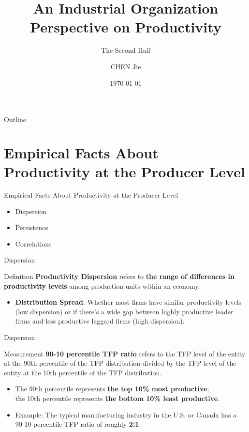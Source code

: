 \documentclass[aspectratio=169]{beamer}  %
\title{An Industrial Organization Perspective on Productivity}
\subtitle{The Second Half}
\author{CHEN Jie}
\institute{Hong Kong University of Science and Technology}
\date{\today}
\begin{document}
\begin{frame}
    \titlepage
\end{frame}

\begin{frame}{Outline}
    \tableofcontents
\end{frame}

\section{Empirical Facts About Productivity at the Producer Level}
\begin{frame}{Empirical Facts About Productivity at the Producer Level}
    \begin{itemize}
        \item Dispersion
        \item Persistence
        \item Correlations
    \end{itemize}
\end{frame}

\begin{frame}{Dispersion}
    \begin{block}{Definition}
        \textbf{Productivity Dispersion} refers to \textbf{the range of differences in productivity levels} among production units within an economy.
    \end{block}
    
    \begin{itemize}
        \item \textbf{Distribution Spread}: Whether most firms have similar productivity levels (low dispersion) or if there's a wide gap between highly productive leader firms and less productive laggard firms (high dispersion).
    \end{itemize}
\end{frame}


\begin{frame}{Dispersion}
    \begin{block}{Measurement}
        \textbf{90-10 percentile TFP ratio} refers to the TFP level of the entity at the 90th percentile of the TFP distribution divided by the TFP level of the entity at the 10th percentile of the TFP distribution.
    \end{block}

    \begin{itemize}
        \item The 90th percentile represents \textbf{the top 10\% most productive};\\
        the 10th percentile represents \textbf{the bottom 10\% least productive}.
        \item Example: The typical manufacturing industry in the U.S. or Canada has a 90-10 percentile TFP ratio of roughly \textbf{2:1}.
    \end{itemize}
\end{frame}
\end{document}
